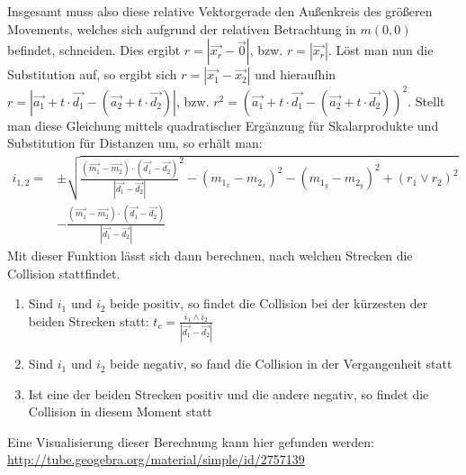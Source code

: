 Insgesamt muss also diese relative Vektorgerade den Außenkreis des größeren Movements, welches sich aufgrund der relativen Betrachtung in $m(0, 0)$ befindet, schneiden. Dies ergibt $r = |\vec{x_r} - \vec{0}|$, bzw. $r = |\vec{x_r}|$. Löst man nun die Substitution auf, so ergibt sich $r = |\vec{x_1} - \vec{x_2}|$ und 
hieraufhin $r = |\vec{a_1} + t \cdot \vec{d_1} - (\vec{a_2} + t \cdot \vec{d_2})|$, bzw. $r^2 = (\vec{a_1} + t \cdot \vec{d_1} - (\vec{a_2} + t \cdot \vec{d_2}))^2$. 
Stellt man diese Gleichung mittels quadratischer Ergänzung für Skalarprodukte und Substitution für Distanzen um, so erhält man:
\begin{equation*}
\begin{split}
i_{1,2} = & \pm \sqrt{\frac{(\vec{m_1} - \vec{m_2}) \cdot (\vec{d_1} - \vec{d_2})}{|\vec{d_1} - \vec{d_2}|}^2 - (m_{1_x} - m_{2_x})^2 - (m_{1_y} - m_{2_y})^2 + (r_1 \vee r_2)^2} \\
  & - \frac{(\vec{m_1} - \vec{m_2}) \cdot (\vec{d_1} - \vec{d_2})}{|\vec{d_1} - \vec{d_2}|}
\end{split}
\end{equation*}
Mit dieser Funktion lässt sich dann berechnen, nach welchen Strecken die Collision stattfindet.
\begin{enumerate}
\item Sind $i_1$ und $i_2$ beide positiv, so findet die Collision bei der kürzesten der beiden Strecken statt: $t_c = \frac{i_1 \wedge i_2}{|\vec{d_1} - \vec{d_2}|}$
\item Sind $i_1$ und $i_2$ beide negativ, so fand die Collision in der Vergangenheit statt
\item Ist eine der beiden Strecken positiv und die andere negativ, so findet die Collision in diesem Moment statt
\end{enumerate}
Eine Visualisierung dieser Berechnung kann hier gefunden werden: \url{http://tube.geogebra.org/material/simple/id/2757139}

